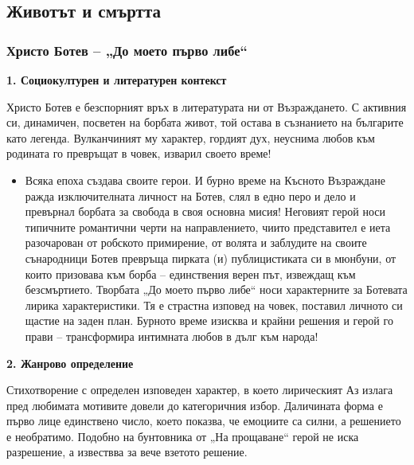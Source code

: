 \documentclass[12pt,a4paper]{article}
\begin{document}
\newpage

\subsection{Животът и смъртта}
\subsubsection{\colorbox{green!40}{Христо Ботев – „До моето първо либе“}}
\vspace{0.1cm}
\textbf{1. Социокултурен и литературен контекст}
\vspace{0.1cm}

\indent Христо Ботев е безспорният връх в литературата ни от Възраждането. С активния си, динамичен, посветен на борбата живот, той остава в съзнанието на българите като легенда. Вулканчиният му характер, гордият дух, неуснима любов към родината го превръщат в човек, изварил своето време!

\vspace{0.1cm}
\begin{itemize}[leftmargin=*, noitemsep, topsep=2pt, parsep=0pt]
    \item Всяка епоха създава своите герои. И бурно време на Късното Възраждане ражда изключителната личност на Ботев, слял в едно перо и дело и превърнал борбата за свобода в своя основна мисия! Неговият герой носи типичните романтични черти на направлението, чиито представител е иета разочарован от робското примирение, от волята и заблудите на своите сънародници Ботев превръща пирката (и) публицистиката си в мюнбуни, от които призовава към борба -- единствения верен път, извеждащ към безсмъртието. Творбата „До моето първо либе“ носи характерните за Ботевата лирика характеристики. Тя е страстна изповед на човек, поставил личното си щастие на заден план. Бурното време изисква и крайни решения и герой го прави -- трансформира интимната любов в дълг към народа!
\end{itemize}

\vspace{0.1cm}
\textbf{2. Жанрово определение}
\vspace{0.1cm}

\indent Стихотворение с определен изповеден характер, в което лирическият Аз излага пред любимата мотивите довели до категоричния избор. Даличината форма е първо лице единствено число, което показва, че емоциите са силни, а решението е необратимо. Подобно на бунтовника от „На прощаване“ герой не иска разрешение, а извествва за вече взетото решение.
\end{document}
